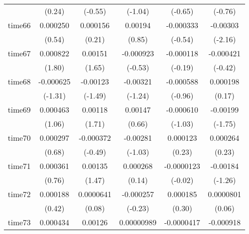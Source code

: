 \begin{table}[htbp]
\begin{tabular}{l*{5}{c}}
            &      (0.24)         &     (-0.55)         &     (-1.04)         &     (-0.65)         &     (-0.76)         \\
time66      &    0.000250         &    0.000156         &     0.00194         &   -0.000333         &    -0.00303\sym{*}  \\
            &      (0.54)         &      (0.21)         &      (0.85)         &     (-0.54)         &     (-2.16)         \\
time67      &    0.000822         &     0.00151         &   -0.000923         &   -0.000118         &   -0.000421         \\
            &      (1.80)         &      (1.65)         &     (-0.53)         &     (-0.19)         &     (-0.42)         \\
time68      &   -0.000625         &    -0.00123         &    -0.00321         &   -0.000588         &    0.000198         \\
            &     (-1.31)         &     (-1.49)         &     (-1.24)         &     (-0.96)         &      (0.17)         \\
time69      &    0.000463         &     0.00118         &     0.00147         &   -0.000610         &    -0.00199         \\
            &      (1.06)         &      (1.71)         &      (0.66)         &     (-1.03)         &     (-1.75)         \\
time70      &    0.000297         &   -0.000372         &    -0.00281         &    0.000123         &    0.000264         \\
            &      (0.68)         &     (-0.49)         &     (-1.03)         &      (0.23)         &      (0.23)         \\
time71      &    0.000361         &     0.00135         &    0.000268         &  -0.0000123         &    -0.00184         \\
            &      (0.76)         &      (1.47)         &      (0.14)         &     (-0.02)         &     (-1.26)         \\
time72      &    0.000188         &   0.0000641         &   -0.000257         &    0.000185         &   0.0000801         \\
            &      (0.42)         &      (0.08)         &     (-0.23)         &      (0.30)         &      (0.06)         \\
time73      &    0.000434         &     0.00126         &  0.00000989         &  -0.0000417         &   -0.000918         \\

\end{tabular}
\end{table}

